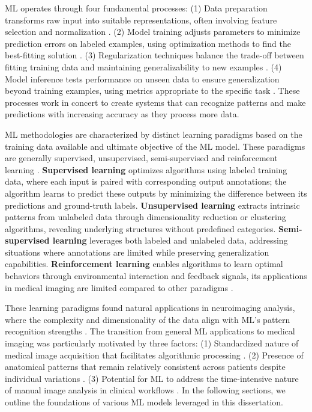 ML operates through four fundamental processes: (1) Data preparation transforms raw input into suitable representations, often involving feature selection and normalization  \cite{Mwangi2014-nl}. (2) Model training adjusts parameters to minimize prediction errors on labeled examples, using optimization methods to find the best-fitting solution \cite{Lemm2011-jm}. (3) Regularization techniques balance the trade-off between fitting training data and maintaining generalizability to new examples \cite{Roberts2021-ib}. (4) Model inference tests performance on unseen data to ensure generalization beyond training examples, using metrics appropriate to the specific task \cite{Varoquaux2022-as}.  These processes work in concert to create systems that can recognize patterns and make predictions with increasing accuracy as they process more data.

ML methodologies are characterized by distinct learning paradigms based on the training data available and ultimate objective of the ML model. These paradigms are generally supervised, unsupervised, semi-supervised and reinforcement learning \cite{Hastie2009-ef}. \textbf{Supervised learning} optimizes algorithms using labeled training data, where each input is paired with corresponding output annotations; the algorithm learns to predict these outputs by minimizing the difference between its predictions and ground-truth labels. \textbf{Unsupervised learning} extracts intrinsic patterns from unlabeled data through dimensionality reduction or clustering algorithms, revealing underlying structures without predefined categories. \textbf{Semi-supervised learning} leverages both labeled and unlabeled data, addressing situations where annotations are limited while preserving generalization capabilities. \textbf{Reinforcement learning} enables algorithms to learn optimal behaviors through environmental interaction and feedback signals, its applications in medical imaging are limited compared to other paradigms \cite{Zhou2021-au}. 

These learning paradigms found natural applications in neuroimaging analysis, where the complexity and dimensionality of the data align with ML's pattern recognition strengths \cite{Vieira2017-vr}. The transition from general ML applications to medical imaging was particularly motivated by three factors:  (1) Standardized nature of medical image acquisition that facilitates algorithmic processing  \cite{Li2020-dy}. (2) Presence of anatomical patterns that remain relatively consistent across patients despite individual variations \cite{Iglesias2023-co}. (3) Potential for ML to address the time-intensive nature of manual image analysis in clinical workflows \cite{Khalifa2024-dn}. In the following sections, we outline the foundations of various ML models leveraged in this dissertation. 

